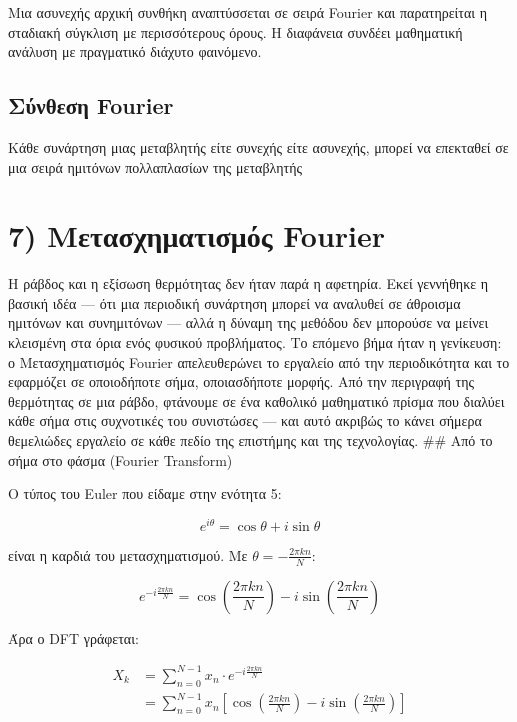 \documentclass[a4paper, 11pt]{article}
\begin{document}
Μια ασυνεχής αρχική συνθήκη αναπτύσσεται σε σειρά Fourier και
παρατηρείται η σταδιακή σύγκλιση με περισσότερους όρους. Η διαφάνεια
συνδέει μαθηματική ανάλυση με πραγματικό διάχυτο φαινόμενο.

\subsection{Σύνθεση
Fourier}\label{ux3c3ux3cdux3bdux3b8ux3b5ux3c3ux3b7-fourier}

Κάθε συνάρτηση μιας μεταβλητής είτε συνεχής είτε ασυνεχής, μπορεί να
επεκταθεί σε μια σειρά ημιτόνων πολλαπλασίων της μεταβλητής

\section{7) Μετασχηματισμός
Fourier}\label{ux3bcux3b5ux3c4ux3b1ux3c3ux3c7ux3b7ux3bcux3b1ux3c4ux3b9ux3c3ux3bcux3ccux3c2-fourier}

Η ράβδος και η εξίσωση θερμότητας δεν ήταν παρά η αφετηρία. Εκεί
γεννήθηκε η βασική ιδέα --- ότι μια περιοδική συνάρτηση μπορεί να
αναλυθεί σε άθροισμα ημιτόνων και συνημιτόνων --- αλλά η δύναμη της
μεθόδου δεν μπορούσε να μείνει κλεισμένη στα όρια ενός φυσικού
προβλήματος. Το επόμενο βήμα ήταν η γενίκευση: ο Μετασχηματισμός Fourier
απελευθερώνει το εργαλείο από την περιοδικότητα και το εφαρμόζει σε
οποιοδήποτε σήμα, οποιασδήποτε μορφής. Από την περιγραφή της θερμότητας
σε μια ράβδο, φτάνουμε σε ένα καθολικό μαθηματικό πρίσμα που διαλύει
κάθε σήμα στις συχνοτικές του συνιστώσες --- και αυτό ακριβώς το κάνει
σήμερα θεμελιώδες εργαλείο σε κάθε πεδίο της επιστήμης και της
τεχνολογίας. \#\# Από το σήμα στο φάσμα (Fourier Transform)

Ο τύπος του Euler που είδαμε στην ενότητα 5:

\[e^{i\theta} = \cos\theta + i\sin\theta\]

είναι η καρδιά του μετασχηματισμού. Με \(\theta = -\frac{2\pi kn}{N}\):

\[e^{-i\frac{2\pi kn}{N}} = \cos\!\left(\frac{2\pi kn}{N}\right) - i\sin\!\left(\frac{2\pi kn}{N}\right)\]

Άρα ο DFT γράφεται:

\[\begin{split}
X_k &= \sum_{n=0}^{N-1} x_n \cdot e^{-i\frac{2\pi kn}{N}} \\[6pt]
    &= \sum_{n=0}^{N-1} x_n \left[\cos\!\left(\frac{2\pi kn}{N}\right)
       - i\sin\!\left(\frac{2\pi kn}{N}\right)\right]
\end{split}\]
\end{document}
